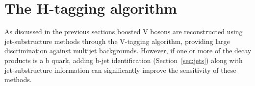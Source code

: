 
\section{The H-tagging algorithm}
\label{sec:htagging}

As discussed in the previous sections boosted V bosons are reconstructed using jet-substructure methods
through the V-tagging algorithm, providing large discrimination against multijet backgrounds.
However, if one or more of the decay products is a b quark, adding b-jet identification (Section~\ref{sec:jets}) along
with jet-substructure information can significantly improve the sensitivity of these methods.

